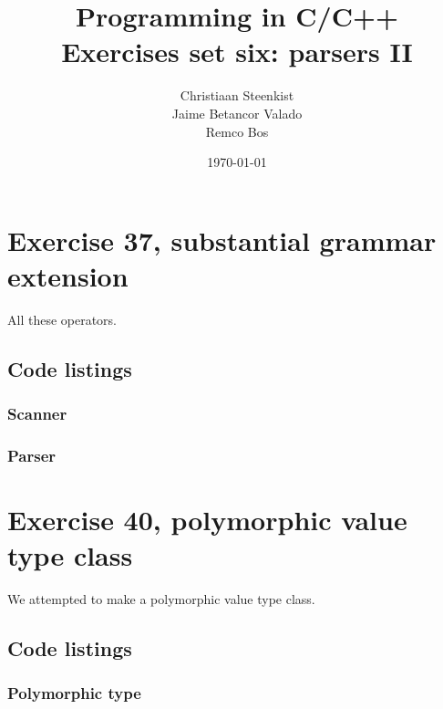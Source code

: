 \documentclass[11pt]{article}
\begin{document}
\title{Programming in C/C++ \\
       Exercises set six: parsers II
}
\date{\today}
\author{Christiaan Steenkist \\
Jaime Betancor Valado \\
Remco Bos \\
}

\maketitle
\section*{Exercise 37, substantial grammar extension}
All these operators.

\subsection*{Code listings}
\subsubsection*{Scanner}


\subsubsection*{Parser}
%
%


\section*{Exercise 40, polymorphic value type class}
We attempted to make a polymorphic value type class.

\subsection*{Code listings}











\subsubsection*{Polymorphic type}




\end{document}
